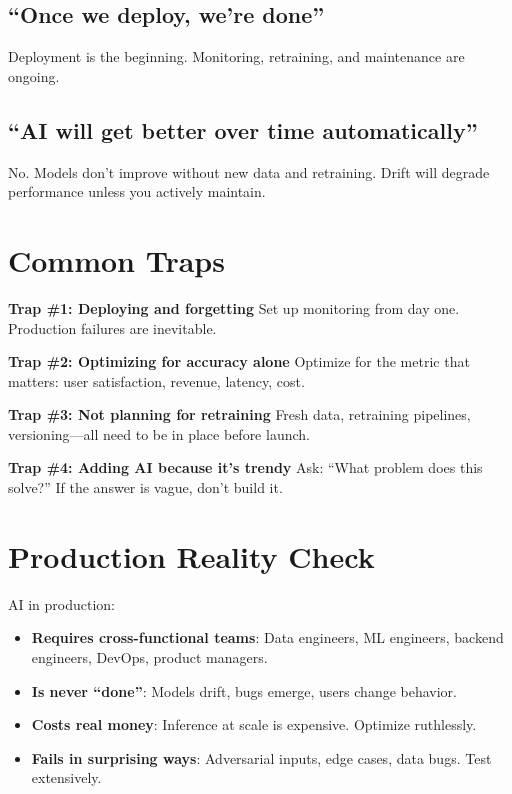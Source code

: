 \documentclass[11pt,oneside]{book}
\begin{document}
\subsection{``Once we deploy, we're done''}
Deployment is the beginning. Monitoring, retraining, and maintenance are ongoing.

\subsection{``AI will get better over time automatically''}
No. Models don't improve without new data and retraining. Drift will degrade performance unless you actively maintain.

\section{Common Traps}

\textbf{Trap \#1: Deploying and forgetting}
Set up monitoring from day one. Production failures are inevitable.

\textbf{Trap \#2: Optimizing for accuracy alone}
Optimize for the metric that matters: user satisfaction, revenue, latency, cost.

\textbf{Trap \#3: Not planning for retraining}
Fresh data, retraining pipelines, versioning---all need to be in place before launch.

\textbf{Trap \#4: Adding AI because it's trendy}
Ask: ``What problem does this solve?'' If the answer is vague, don't build it.

\section{Production Reality Check}

AI in production:

\begin{itemize}
\item \textbf{Requires cross-functional teams}: Data engineers, ML engineers, backend engineers, DevOps, product managers.
\item \textbf{Is never ``done''}: Models drift, bugs emerge, users change behavior.
\item \textbf{Costs real money}: Inference at scale is expensive. Optimize ruthlessly.
\item \textbf{Fails in surprising ways}: Adversarial inputs, edge cases, data bugs. Test extensively.
\end{itemize}
\end{document}

